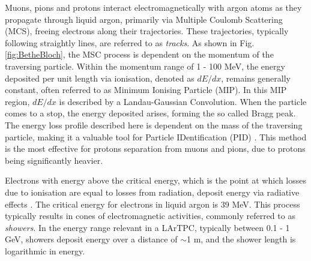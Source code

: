 Muons, pions and protons interact electromagnetically with argon atoms as they propagate through liquid argon, primarily via Multiple Coulomb Scattering (MCS), freeing electrons along their trajectories.
These trajectories, typically following straightly lines, are referred to as \textit{tracks}.
As shown in Fig. \ref{fig:BetheBloch}, the MSC process is dependent on the momentum of the traversing particle.
Within the momentum range of 1 - 100 MeV, the energy deposited per unit length via ionisation, denoted as $dE/dx$, remains generally constant, often referred to as Minimum Ionising Particle (MIP).
In this MIP region, $dE/dx$ is described by a Landau-Gaussian Convolution. 
When the particle comes to a stop, the energy deposited arises, forming the so called Bragg peak.
The energy loss profile described here is dependent on the mass of the traversing particle, making it a valuable tool for Particle IDentification (PID) \cite{argoneut}.
This method is the most effective for protons separation from muons and pions, due to protons being significantly heavier.


Electrons with energy above the critical energy, which is the point at which losses due to ionisation are equal to losses from radiation, deposit energy via radiative effects \cite{uboone_gamma}.
The critical energy for electrons in liquid argon is 39 MeV.
This process typically results in cones of electromagnetic activities, commonly referred to as \textit{showers}. 
In the energy range relevant in a LArTPC, typically between 0.1 - 1 GeV, showers deposit energy over a distance of $\sim$1 m, and the shower length is logarithmic in energy.

